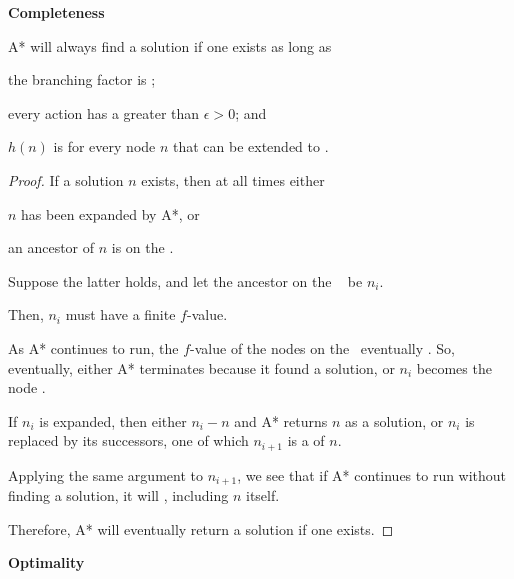 \begin{listu}
    \item \textbf{Completeness}

    \begin{theorem}\label{thm:completeness-of-astar}
        A* will always find a solution if one exists as long as

        \begin{listu}
            \item the branching factor is ;
            \item every action has a  greater than $\epsilon > 0$; and
            \item $h(n)$ is  for every node $n$ that can be extended to .
        \end{listu}
    \end{theorem}

    \begin{proof}
        If a solution $n$ exists, then at all times either
        \begin{listu}
            \item $n$ has been expanded by A*, or
            \item an ancestor of $n$ is on the \Frontier.
        \end{listu}

        Suppose the latter holds, and let the ancestor on the \Frontier~ be $n_i$.

        Then, $n_i$ must have a finite $f$-value.

        As A* continues to run, the $f$-value of the nodes on the \Frontier~eventually . So, eventually, either A* terminates because it found a solution, or $n_i$ becomes the node .

        If $n_i$ is expanded, then either $n_i - n$ and A* returns $n$ as a solution, or $n_i$ is replaced by its successors, one of which $n_{i+1}$ is a  of $n$.

        Applying the same argument to $n_{i+1}$, we see that if A* continues to run without finding a solution, it will , including $n$ itself.

        Therefore, A* will eventually return a solution if one exists.
    \end{proof}

    \item \textbf{Optimality}


\end{listu}
